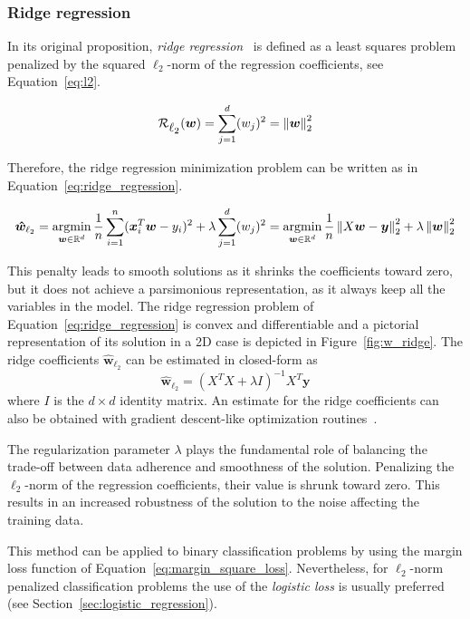 			\subsubsection{Ridge regression}
			In its original proposition, \textit{ridge regression}~\cite{hoerl1970ridge} is defined as a least squares problem penalized by the squared $\ell_2$-norm of the regression coefficients, see Equation~\eqref{eq:l2}.

			\begin{equation}\label{eq:l2}
				\mathcal{R}_{\mbox{$\ell_2$}}(\bm{w}) = \sum_{j=1}^d (w_j)^2 = \left\lVert\bm{w}\right\rVert_2^2
			\end{equation}

			Therefore, the ridge regression minimization problem can be written as in Equation~\eqref{eq:ridge_regression}.

			\begin{equation} \label{eq:ridge_regression}
				\bm{\hat w}_{\ell_2} = \mathop{\mathrm{argmin}}\limits_{\bm{w} \in \mathbb{R}^d} \frac{1}{n} \sum_{i=1}^n (\bm{x}_i^T\bm{w} - y_i)^2 + \lambda  \sum_{j=1}^d (w_j)^2 = \mathop{\mathrm{argmin}}\limits_{\bm{w} \in \mathbb{R}^d} \frac{1}{n} \left\lVert X\bm{w} - \bm{y}\right\rVert_2^2 + \lambda \left\lVert\bm{w}\right\rVert_2^2
			\end{equation}

			This penalty leads to smooth solutions as it shrinks the coefficients toward zero, but it does not achieve a parsimonious representation, as it always keep all the variables in the model.
			The ridge regression problem of Equation~\eqref{eq:ridge_regression} is convex  and differentiable and a pictorial representation of its solution in a 2D case is depicted in Figure~\ref{fig:w_ridge}. The ridge coefficients $\bm{\hat w}_{\ell_2}$ can be estimated in closed-form as
			$$
				\bm{\hat w}_{\ell_2} = (X^TX + \lambda I)^{-1}X^T\bm{y}
			$$
			where $I$ is the $d \times d$ identity matrix. An estimate for the ridge coefficients can also be obtained with gradient descent-like optimization routines~\cite{boyd2004convex, sra2012optimization}.

			The regularization parameter $\lambda$ plays the fundamental role of balancing the trade-off between data adherence and smoothness of the solution.
			Penalizing the $\ell_2$-norm of the regression coefficients, their value is shrunk toward zero. This results in an increased robustness of the solution to the noise affecting the training data.

			This method can be applied to binary classification problems by using the margin loss function of Equation~\eqref{eq:margin_square_loss}. Nevertheless, for $\ell_2$-norm penalized classification problems the use of the \textit{logistic loss} is usually preferred (see Section~\ref{sec:logistic_regression}).

